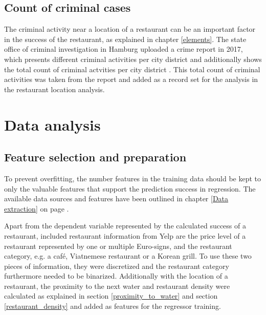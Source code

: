 \documentclass[a4paper, 11pt, oneside]{Thesis}  %
\begin{document}
\section{Count of criminal cases}
\label{criminal_count}

The criminal activity near a location of a restaurant can be an important factor in the success of the restaurant, as explained in chapter \ref{elements}. The state office of criminal investigation in Hamburg uploaded a crime report in 2017, which presents different criminal activities per city district and additionally shows the total count of criminal actvities per city district \cite{LandeskriminalamtHamburg.2017}. This total count of criminal activities was taken from the report and added as a record set for the analysis in the restaurant location analysis.

\chapter{Data analysis}

\section{Feature selection and preparation}

To prevent overfitting, the number features in the training data should be kept to only the valuable features that support the prediction success in regression. The available data sources and features have been outlined in chapter \ref{Data extraction} on page \pageref{Data extraction}. 

Apart from the dependent variable represented by the calculated success of a restaurant, included restaurant information from Yelp are the price level of a restaurant represented by one or multiple Euro-signs, and the restaurant category, e.g. a café, Viatnemese restaurant or a Korean grill. To use these two pieces of information, they were discretized and the restaurant category furthermore needed to be binarized. Additionally with the location of a restaurant, the proximity to the next water and restaurant density were calculated as explained in section \ref{proximity_to_water} and section \ref{restaurant_density} and added as features for the regressor training.
\end{document}
